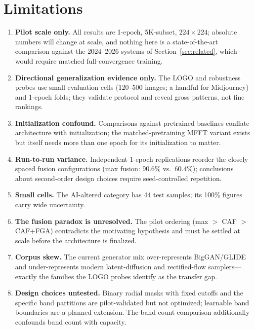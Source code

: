 \documentclass[journal]{IEEEtran}
\begin{document}
\section{Limitations}
\label{sec:limitations}
\begin{enumerate}
    \item \textbf{Pilot scale only.} All results are 1-epoch, 5K-subset, $224\times224$; absolute numbers will change at scale, and nothing here is a state-of-the-art comparison against the 2024--2026 systems of Section~\ref{sec:related}, which would require matched full-convergence training.
    \item \textbf{Directional generalization evidence only.} The LOGO and robustness probes use small evaluation cells (120--500 images; a handful for Midjourney) and 1-epoch folds; they validate protocol and reveal gross patterns, not fine rankings.
    \item \textbf{Initialization confound.} Comparisons against pretrained baselines conflate architecture with initialization; the matched-pretraining MFFT variant exists but itself needs more than one epoch for its initialization to matter.
    \item \textbf{Run-to-run variance.} Independent 1-epoch replications reorder the closely spaced fusion configurations (max fusion: 90.6\% vs.\ 60.4\%); conclusions about second-order design choices require seed-controlled repetition.
    \item \textbf{Small cells.} The AI-altered category has 44 test samples; its 100\% figures carry wide uncertainty.
    \item \textbf{The fusion paradox is unresolved.} The pilot ordering (max $>$ CAF $>$ CAF+FGA) contradicts the motivating hypothesis and must be settled at scale before the architecture is finalized.
    \item \textbf{Corpus skew.} The current generator mix over-represents BigGAN/GLIDE and under-represents modern latent-diffusion and rectified-flow samplers---exactly the families the LOGO probes identify as the transfer gap.
    \item \textbf{Design choices untested.} Binary radial masks with fixed cutoffs and the specific band partitions are pilot-validated but not optimized; learnable band boundaries are a planned extension. The band-count comparison additionally confounds band count with capacity.
\end{enumerate}
\end{document}
